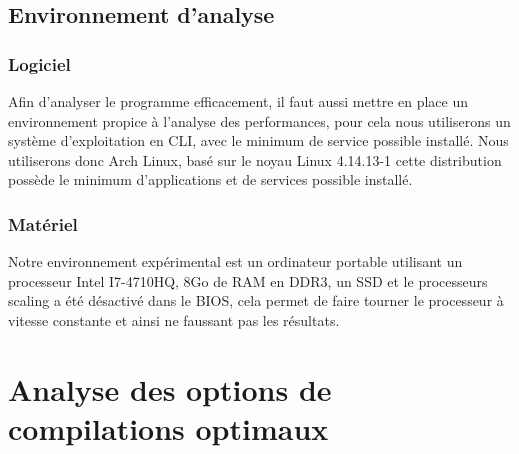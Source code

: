 \documentclass[
 aip,
 jmp,
 amsmath,amssymb,
 reprint
]{revtex4-1}
\begin{document}
\subsection{Environnement d'analyse}
\subsubsection{Logiciel}
Afin d'analyser le programme efficacement, il faut aussi mettre en place un environnement propice à l'analyse des performances, pour cela nous utiliserons un système d'exploitation en CLI, avec le minimum de service possible installé. Nous utiliserons donc Arch Linux, basé sur le noyau Linux 4.14.13-1 cette distribution possède le minimum d'applications et de services possible installé.\\

\subsubsection{Matériel}
Notre environnement expérimental est un ordinateur portable utilisant un processeur Intel I7-4710HQ, 8Go de RAM en DDR3, un SSD et le processeurs scaling a été désactivé dans le BIOS, cela permet de faire tourner le processeur à vitesse constante et ainsi ne faussant pas les résultats.

\section{Analyse des options de compilations optimaux}
\end{document}
